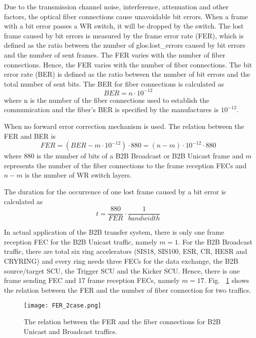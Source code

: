 Due to the transmission channel noise, interference, attenuation and other factors, the optical fiber connections cause unavoidable bit errors. When a frame with a bit error passes a WR switch, it will be dropped by the switch. The lost frame caused by bit errors is measured by the frame error rate (\gls{FER}), which is defined as the ratio between the number of \gls{glos:lost_error}s caused by bit errors and the number of sent frames. The FER varies with the number of fiber connections. Hence, the FER varies with the number of fiber connections. The bit error rate (\gls{BER}) is defined as the ratio between the number of bit errors and the total number of sent bits. The BER for fiber connections is calculated as~\cite{prados_white_2011} 
\begin{equation}
	BER=n\cdot10^{-12}
\end{equation}
where n is the number of the fiber connections used to establish the communication and the fiber's BER is specified by the manufactures is $10^{-12}$. 
 
When no forward error correction mechanism is used. The relation between the FER and BER is
\begin{equation}
\label{m-n}
	FER=(BER-m\cdot10^{-12})\cdot 880=(n-m)\cdot10^{-12}\cdot 880
\end{equation}
where 880 is the number of bits of a B2B Broadcast or B2B Unicast frame and $m$ represents the number of the fiber connections to the frame reception FECs and $n-m$ is the number of WR switch layers.  

The duration for the occurrence of one lost frame caused by a bit error is calculated as 
\begin{equation}
\label{duration}
	t=\frac{880}{FER}\cdot \frac{1}{bandwidth}
\end{equation}
 
In actual application of the B2B transfer system, there is only one frame reception FEC for the B2B Unicast traffic, namely $m=1$. For the B2B Broadcast traffic, there are total six ring accelerators (SIS18, SIS100, ESR, CR, HESR and CRYRING) and every ring needs three FECs for the data exchange, the B2B source/target SCU, the Trigger SCU and the Kicker SCU. Hence, there is one frame sending FEC and 17 frame reception FECs, namely $m=17$. Fig. ~\ref{FER_2case} shows the relation between the FER and the number of fiber connection for two traffics.   
\begin{figure}[H]
   \centering   
   \texttt{[image: FER\_2case.png]}
   \caption{The relation between the FER and the fiber connections for B2B Unicast and Broadcast traffics.}
   \label{FER_2case}
\end{figure}


